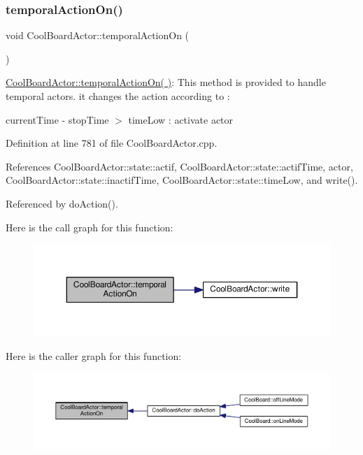 \subsubsection{\texorpdfstring{temporal\+Action\+On()}{temporalActionOn()}}
{\footnotesize\ttfamily void Cool\+Board\+Actor\+::temporal\+Action\+On (\begin{DoxyParamCaption}{ }\end{DoxyParamCaption})}

\hyperlink{class_cool_board_actor_ada603785c203fdb0b41cc967d70bdc4d}{Cool\+Board\+Actor\+::temporal\+Action\+On( )}\+: This method is provided to handle temporal actors. it changes the action according to \+:

current\+Time -\/ stop\+Time $>$ time\+Low \+: activate actor 

Definition at line 781 of file Cool\+Board\+Actor.\+cpp.



References Cool\+Board\+Actor\+::state\+::actif, Cool\+Board\+Actor\+::state\+::actif\+Time, actor, Cool\+Board\+Actor\+::state\+::inactif\+Time, Cool\+Board\+Actor\+::state\+::time\+Low, and write().



Referenced by do\+Action().

Here is the call graph for this function\+:
\nopagebreak
\begin{figure}[H]
\begin{center}
\leavevmode
\includegraphics[width=350pt]{dc/d69/class_cool_board_actor_ada603785c203fdb0b41cc967d70bdc4d_cgraph}
\end{center}
\end{figure}
Here is the caller graph for this function\+:
\nopagebreak
\begin{figure}[H]
\begin{center}
\leavevmode
\includegraphics[width=350pt]{dc/d69/class_cool_board_actor_ada603785c203fdb0b41cc967d70bdc4d_icgraph}
\end{center}
\end{figure}
\mbox{\label{class_cool_board_actor_a00b29c4abf0388551aa6812372113cf1}} 

